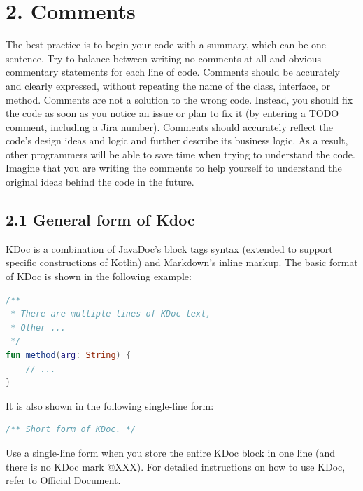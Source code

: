 \section*{\textbf{2. Comments}}
\label{sec:2.}
The best practice is to begin your code with a summary, which can be one sentence.
Try to balance between writing no comments at all and obvious commentary statements for each line of code.
Comments should be accurately and clearly expressed, without repeating the name of the class, interface, or method.
Comments are not a solution to the wrong code. Instead, you should fix the code as soon as you notice an issue or plan to fix it (by entering a TODO comment, including a Jira number).
Comments should accurately reflect the code's design ideas and logic and further describe its business logic.
As a result, other programmers will be able to save time when trying to understand the code.
Imagine that you are writing the comments to help yourself to understand the original ideas behind the code in the future. 
\subsection*{\textbf{2.1 General form of Kdoc}}
\label{sec:2.1}
KDoc is a combination of JavaDoc's block tags syntax (extended to support specific constructions of Kotlin) and Markdown's inline markup.
The basic format of KDoc is shown in the following example:
\begin{lstlisting}[language=Kotlin]
 /**
 * There are multiple lines of KDoc text,
 * Other ...
 */
fun method(arg: String) {
    // ...
}
\end{lstlisting}
It is also shown in the following single-line form:
\begin{lstlisting}[language=Kotlin]
 /** Short form of KDoc. */
\end{lstlisting}
Use a single-line form when you store the entire KDoc block in one line (and there is no KDoc mark @XXX). For detailed instructions on how to use KDoc, refer to \href{https://docs.oracle.com/en/Kotlin/Kotlinse/11/tools/KDoc.html}{Official Document}.
